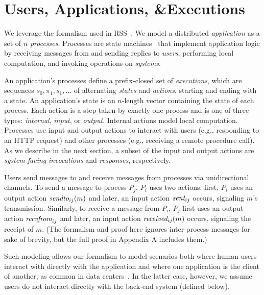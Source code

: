 \section{Users, Applications, \&Executions}
\label{sec:mdl:applications}

We leverage the formalism used in RSS~\cite{helt2021rss}. We model a
distributed \textit{application} as a set of $n$ \textit{processes}.
Processes are state machines~\cite{lynch1987ioa,lynch1996da}
that implement application logic by receiving messages from and sending replies
to \textit{users}, performing local computation,
and invoking operations on \textit{systems}.

An application's processes define a prefix-closed set of \textit{executions},
which are sequences $s_0,\pi_1,s_1,\ldots$ of alternating \textit{states} and
\textit{actions}, starting and ending with a state. An application's state
is an $n$-length vector containing the state of each process.
%
Each action is a step taken by exactly one process and is one of three types:
\textit{internal}, \textit{input}, or \textit{output}. Internal actions model
local computation. Processes use input and output actions to interact with
users (e.g., responding to an HTTP request) and other
processes (e.g., receiving a remote procedure call).
As we describe in the next section, a subset of the input and output actions
are \textit{system-facing} \textit{invocations} and \textit{responses}, 
respectively.

Users send messages to and receive messages from processes via unidirectional
channels. To send a message to process $P_j$, $P_i$ uses two
actions: first, $P_i$ uses an output action $\operatorname*{\operatorname*{\textit{sendto}}}_{ij}(m)$
and later, an input action $\operatorname*{\textit{sent}}_{ij}$ occurs, signaling $m$'s 
transmission. Similarly, to receive a message from $P_i$, $P_j$ first
uses an output action $\operatorname*{\textit{recvfrom}}_{ij}$ and later, an input action
$\operatorname*{\textit{received}}_{ij}(m)$ occurs, signaling the receipt of $m$.
(The formalism and proof here ignores inter-process messages for sake of brevity, but the full
proof in Appendix A includes them.)

Such modeling allows our formalism to model scenarios both where human users interact with
directly with the application and where one application is the client
of another, as common in data centers~\cite{veeraraghavan2016kraken,schwarzkopf2018operating}.
In the latter case, however, we assume users do not interact directly with the back-end system (defined below).

